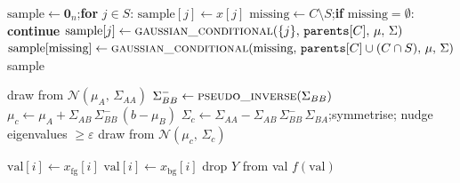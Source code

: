 \documentclass[12pt,letterpaper,twocolumn]{article}
\begin{document}
\begin{algorithm}[H]
  \caption{POST\_INTERVENTIONAL\_SAMPLE --- draw from $P(X \mid \mathrm{do}(X_S = x_S))$}
  \label{alg:post_int}
  \begin{algorithmic}[1]
      \State $\text{sample} \gets \mathbf{0}_n$;\quad \textbf{for} $j \in S$: $\text{sample}[j] \gets x[j]$
        \State $\text{missing} \gets C \setminus S$;\quad \textbf{if} $\text{missing} = \emptyset$: \textbf{continue}
            \State $\text{sample}[j] \gets \textsc{gaussian\_conditional}(\{j\},\, \texttt{parents}[C],\, \mu,\, \Sigma)$
          \EndFor
        \Else
          \State $\text{sample}[\text{missing}] \gets \textsc{gaussian\_conditional}(\text{missing},\, \texttt{parents}[C] \cup (C \cap S),\, \mu,\, \Sigma)$
        \EndIf
      \EndFor
      \Return sample
    \EndFunction
  \end{algorithmic}
\end{algorithm}

\begin{algorithm}[H]
  \caption{GAUSSIAN\_CONDITIONAL --- closed-form conditional Gaussian draw}
  \label{alg:gaussian_cond}
  \begin{algorithmic}[1]
        \Return draw from $\mathcal{N}(\mu_A,\, \Sigma_{AA})$
      \EndIf
      \State $\Sigma_{BB}^{-} \gets \textsc{pseudo\_inverse}(\Sigma_{BB})$
      \State $\mu_c \gets \mu_A + \Sigma_{AB}\,\Sigma_{BB}^{-}\,(b - \mu_B)$
      \State $\Sigma_c \gets \Sigma_{AA} - \Sigma_{AB}\,\Sigma_{BB}^{-}\,\Sigma_{BA}$;\quad symmetrise; nudge eigenvalues $\geq \varepsilon$
      \Return draw from $\mathcal{N}(\mu_c,\, \Sigma_c)$
    \EndFunction
  \end{algorithmic}
\end{algorithm}

\begin{algorithm}[H]
  \caption{SYSTEM\_VALUE --- binary foreground/background activation (Shapley Flow)}
  \label{alg:system_value}
  \begin{algorithmic}[1]
          \State $\mathrm{val}[i] \gets x_{\mathrm{fg}}[i]$
        \Else
          \State $\mathrm{val}[i] \gets x_{\mathrm{bg}}[i]$
        \EndIf
      \EndFor
      \State drop $Y$ from val
      \Return $f(\mathrm{val})$
    \EndFunction
  \end{algorithmic}
\end{algorithm}
\end{document}
